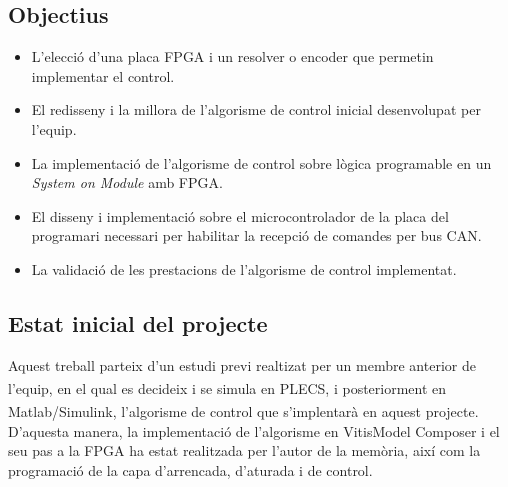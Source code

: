 \subsection{Objectius}
{ 
    \begin{itemize}
        \item 
            L’elecció d’una placa FPGA i un resolver o encoder que permetin
            implementar el control.
        \item 
            El redisseny i la millora de l’algorisme de control inicial
            desenvolupat per l’equip.
        \item   
            La implementació de l’algorisme de control sobre lògica programable
            en un \emph{System on Module} amb FPGA.
        \item
            El disseny i implementació sobre el microcontrolador de la placa
            del programari necessari per habilitar la recepció de comandes
            per bus CAN.
        \item
            La validació de les prestacions de l’algorisme de control
            implementat.
    \end{itemize}
}

\subsection { Estat inicial del projecte }
{
    Aquest treball parteix d'un estudi previ realtizat per un membre anterior
    de l'equip, en el qual es decideix i se simula en
    PLECS\textsuperscript{\textregistered}, i posteriorment en
    Matlab/Simulink\textsuperscript{\textregistered}, l'algorisme de control
    que s'implentarà en aquest projecte. D'aquesta manera, la implementació de
    l'algorisme en Vitis\texttrademark Model Composer i el seu pas a la FPGA ha
    estat realitzada per l'autor de la memòria, així com la programació de la
    capa d'arrencada, d'aturada i de control.
}

